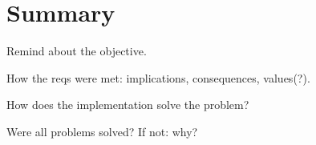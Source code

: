 %
%
%
%
%

\chapter{Summary}
\label{chap:summary}

Remind about the objective.

How the reqs were met: implications, consequences, values(?).

How does the implementation solve the problem?

Were all problems solved? If not: why?
